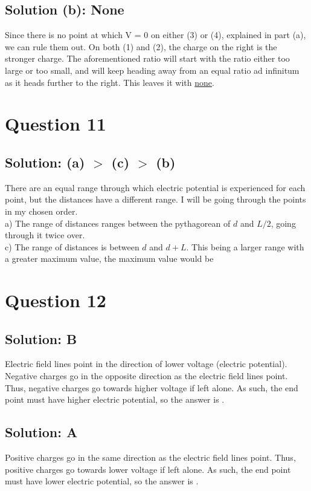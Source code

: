 \documentclass[12pt]{article}
\begin{document}
\subsection{Solution (b): None}
Since there is no point at which V = 0 on either (3) or (4), explained in part (a), we can rule them out. 
On both (1) and (2), the charge on the right is the stronger charge.
The aforementioned ratio will start with the ratio either too large or too small, and will keep heading away from an equal ratio ad infinitum as it heads further to the right. 
This leaves it with \underline{none}.


\section{Question 11}
\subsection*{Solution: (a) $>$ (c) $>$ (b)}
There are an equal range through which electric potential is experienced for each point, but the distances have a different range.
I will be going through the points in my chosen order.\\
a) The range of distances ranges between the pythagorean of $d$ and $L/2$, going through it twice over.\\
c) The range of distances is between $d$ and $d + L$. This being a larger range with a greater maximum value, the maximum value would be 

\section{Question 12}
\subsection{Solution: B}
Electric field lines point in the direction of lower voltage (electric potential).
Negative charges go in the opposite direction as the electric field lines point.
Thus, negative charges go towards higher voltage if left alone.
As such, the end point must have higher electric potential, so the answer is .

\subsection{Solution: A}
Positive charges go in the same direction as the electric field lines point.
Thus, positive charges go towards lower voltage if left alone.
As such, the end point must have lower electric potential, so the answer is .
\end{document}
